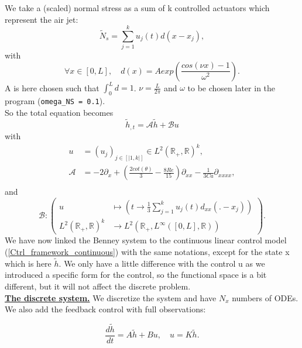 \documentclass[12pt]{article}
\begin{document}
We take a (scaled) normal stress as a sum of k controlled actuators which represent the air jet: 
\begin{equation}\label{eq:decomposition_of_the_control}
\boxed{
    \tilde{N}_s = \sum_{j=1}^ku_j(t)d(x-x_j),
}
\end{equation}
with 
\begin{equation}\label{eq:shapefunction_for_airjets}
    \boxed{
    \forall x \in [0,L], \quad d(x)=Aexp\left(\frac{cos(\nu x)-1}{\omega^2}\right).
    }
\end{equation}
A is here chosen such that $\int_0^Ld = 1$. $\nu=\frac{L}{2\pi}$ and $\omega$ to be chosen later in the program (\texttt{omega\_NS = 0.1}).\\


So the total equation becomes
\begin{equation*}
    \tilde{h}_{,t} = \mathcal{A}\tilde{h} + \mathcal{B} u
\end{equation*}
with
\begin{align*}
     u&=(u_j)_{j\in[|1,k|]}\in L^2(\mathbb{R}_+,\mathbb{R})^k, \\
     \mathcal{A}&= -2\partial_x + (\frac{2cot(\theta)}{3}-\frac{8Re}{15})\partial_{xx} - \frac{1}{3Ca}\partial_{xxxx},\\
\end{align*}
and 
\begin{equation*}
         \mathcal{B}: \left(
         \begin{aligned}
             u\ &\mapsto \left( t \rightarrow \frac{1}{3}\sum_{j=1}^ku_j(t)d_{xx}(.-x_j) \right) \\
             L^2(\mathbb{R}_+,\mathbb{R})^k &\rightarrow L^2(\mathbb{R}_+, L^{\infty}([0,L], \mathbb{R}))
         \end{aligned}
         \right).
\end{equation*}
We have now linked the Benney system to the continuous linear control model (\ref{Ctrl_framework_continuous}) with the same notations, 
except for the state x which is here $\tilde{h}$. We only have a little difference with the control u as we introduced a specific
 form for the control, so the functional space is a bit different, but it will not affect the discrete problem. \\

\underline{\textbf{The discrete system.}}
We discretize the system and have $N_x$ numbers of ODEs. We also add the feedback control with full observations: 

\begin{equation}\label{eq_discrete_ctrl_FLF}
\boxed{
\frac{d\tilde{h}}{dt} = A\tilde{h} + B u, \quad u = K\tilde{h}.}
 \end{equation}
\end{document}
